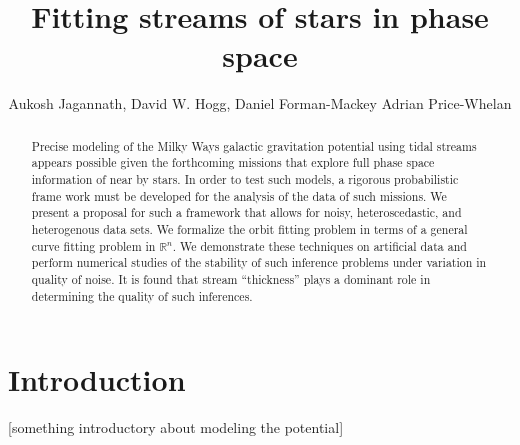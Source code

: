 \documentclass[12pt,preprint]{aastex}
\newcounter{address}
\theoremstyle{plain}
\theoremstyle{definition}
\newcommand{\R}{\mathbb{R}}
\begin{document}
\title{Fitting streams of stars in phase space}
\author{Aukosh Jagannath\altaffilmark{\ref{CIMS},\ref{CCPP}},
        David W. Hogg\altaffilmark{\ref{CCPP},\ref{MPIA},\ref{email}},
	Daniel Forman-Mackey\altaffilmark{\ref{CCPP}}
        Adrian Price-Whelan\altaffilmark{\ref{CCPP}}}
\setcounter{address}{1}


\begin{abstract}
Precise modeling of the Milky Ways galactic gravitation potential using tidal streams appears possible given the forthcoming missions that explore full phase space information of near by stars. In order to test such models, a rigorous probabilistic frame work must be developed for the analysis of the data of such missions. We present a proposal for such a framework that allows for noisy, heteroscedastic, and heterogenous data sets. We formalize the orbit fitting problem in terms of a general curve fitting problem in $\R^n$. We demonstrate these techniques on artificial data and perform numerical studies of the stability of such inference problems under variation in quality of noise. It is found that stream ``thickness'' plays a dominant role in determining the quality of such inferences.
\end{abstract}


\section{Introduction}
 [something introductory about modeling the potential]
\end{document}
